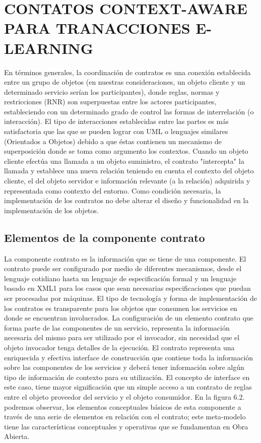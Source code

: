 \documentclass[12 pt,a4paper]{llncs}
\begin{document}
\section{CONTATOS CONTEXT-AWARE PARA TRANACCIONES E-LEARNING} \label{contrato}

En términos generales, la coordinación de contratos es una conexión establecida entre un grupo de objetos (en nuestras consideraciones, un objeto cliente y un determinado servicio serían los participantes), donde reglas, normas y restricciones (RNR) son superpuestas entre los actores participantes, estableciendo con un determinado grado de control las formas de interrelación (o interacción). 
El tipo de interacciones establecidas entre las partes es más satisfactoria que las que se pueden lograr con UML o lenguajes similares (Orientados a Objetos) debido a que éstas contienen un mecanismo de superposición donde se toma como argumento los contextos. Cuando un objeto cliente efectúa una llamada a un objeto suministro, el contrato "intercepta" la llamada y establece una nueva relación teniendo en cuenta el contexto del objeto cliente, el del objeto servidor e información relevante (a la relación) adquirida y representada como contexto del entorno. Como condición necesaria, la implementación de los contratos no debe alterar el diseño y funcionalidad en la implementación de los objetos.


\subsection {Elementos de la componente contrato}

La componente contrato es la información que se tiene de una componente. El contrato puede ser configurado por medio de diferentes mecanismos, desde el lenguaje cotidiano hasta un lenguaje de especificación formal y un lenguaje basado en XML1 para los casos que sean necesarias especificaciones que puedan ser procesadas por máquinas. 
El tipo de tecnología y forma de implementación de los contratos es transparente para los objetos que consumen los servicios en donde se encuentran involucrados.
La configuración de un elemento contrato que forma parte de  las componentes de un servicio, representa la información necesaria del mismo para ser utilizado por el invocador, sin necesidad que el objeto invocador tenga detalles de la ejecución.
El contrato representa una enriquecida y efectiva interface de construcción que contiene toda la información sobre las componentes de los servicios y deberá tener información sobre algún tipo de información de contexto para su utilización.
El concepto de interface en este caso, tiene mayor significación que un simple acceso a un contrato de reglas entre el objeto proveedor del servicio y el objeto consumidor.
En la figura 6.2. podremos observar, los elementos conceptuales básicos de esta componente a través de una serie de elementos en relación con el contrato; este meta-modelo tiene las características conceptuales y operativas que se fundamentan en Obra Abierta. 
\end{document}
